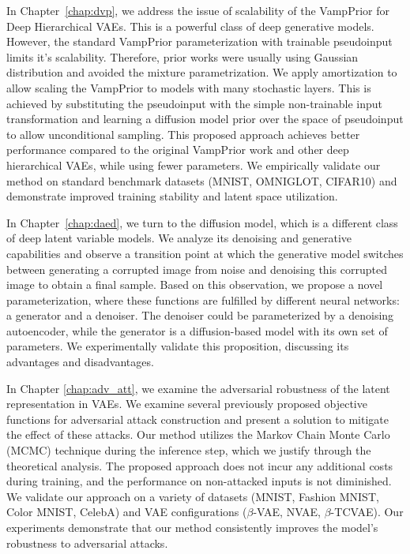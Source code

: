 In Chapter~\ref{chap:dvp}, we address the issue of scalability of the VampPrior for Deep Hierarchical VAEs. 
This is a powerful class of deep generative models.
However, the standard VampPrior parameterization with trainable pseudoinput limits it's scalability. 
Therefore, prior works were usually using Gaussian distribution and avoided the mixture parametrization.
We apply amortization to allow scaling the VampPrior to models with many stochastic layers. 
This is achieved by substituting the pseudoinput with the simple non-trainable input transformation and learning a diffusion model prior over the space of pseudoinput to allow unconditional sampling.
This proposed approach achieves better performance compared to the original VampPrior work and other deep hierarchical VAEs, while using fewer parameters. 
We empirically validate our method on standard benchmark datasets (MNIST, OMNIGLOT, CIFAR10) and demonstrate improved training stability and latent space utilization.

In Chapter~\ref{chap:daed}, we turn to the diffusion model, which is a different class of deep latent variable models. 
We analyze its denoising and generative capabilities and observe a transition point at which the generative model switches between generating a corrupted image from noise and denoising this corrupted image to obtain a final sample. 
Based on this observation, we propose a novel parameterization, where these functions are fulfilled by different neural networks: a generator and a denoiser.
The denoiser could be parameterized by a denoising autoencoder, while the generator is a diffusion-based model with its own set of parameters. 
We experimentally validate this proposition, discussing its advantages and disadvantages.


In Chapter \ref{chap:adv_att}, we examine the adversarial robustness of the latent representation in VAEs.
We examine several previously proposed objective functions for adversarial attack construction and present a solution to mitigate the effect of these attacks. 
Our method utilizes the Markov Chain Monte Carlo (MCMC) technique during the inference step, which we justify through the theoretical analysis. 
The proposed approach does not incur any additional costs during training, and the performance on non-attacked inputs is not diminished. 
We validate our approach on a variety of datasets (MNIST, Fashion MNIST, Color MNIST, CelebA) and VAE configurations ($\beta$-VAE, NVAE, $\beta$-TCVAE).
Our experiments demonstrate that our method consistently improves the model's robustness to adversarial attacks.


